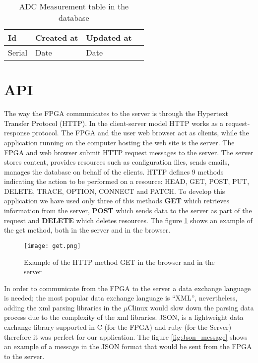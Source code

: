 \begin{table}[h!]
\centering
    \begin{tabular}{| l | l | l | l |}
	\hline
       Id & Created at & Updated at \\ \hline
       Serial & Date & Date\\ \hline
    \end{tabular}
    \caption{ADC Measurement table in the database}
    \label{tab:ADC_measurement_table}
\end{table}


\section{API}

The way the FPGA communicates to the server is through the Hypertext Transfer Protocol (HTTP). In the client-server model HTTP works as a request-response protocol. The FPGA and the user web browser act as clients, while the application running 
on the computer hosting the web site is the server. The FPGA and web browser submit HTTP request messages to the server. The server stores content, provides resources such as configuration files, sends emails, manages the database on behalf of the clients. 
HTTP defines 9 methods indicating the action to be performed on a resource: HEAD, GET, POST, PUT, DELETE, TRACE, OPTION, CONNECT and PATCH. To develop this application we have used only three of this methods {\bf GET} which retrieves information from the server, 
{\bf POST} which sends data to the server as part of the request and {\bf DELETE} which deletes resources. The figure \ref{fig:get_example} shows an example of the get method, both in the server and in the browser.

\begin{figure}[htb]
\centering
\texttt{[image: get.png]}
\caption{Example of the HTTP method GET in the browser and in the server}
\label{fig:get_example}
\end{figure}

In order to communicate from the FPGA to the server a data exchange language is needed; the most popular data exchange language is ``XML'', nevertheless, adding the xml parsing libraries in the $\mu$Clinux
would slow down the parsing data process due to the complexity of the xml libraries. JSON, is a lightweight data exchange library supported in C (for the FPGA) and ruby (for the Server) therefore it was perfect 
for our application. The figure \ref{fig:Json_message} shows an example of a message in the JSON format that would be sent from the FPGA to the server.

